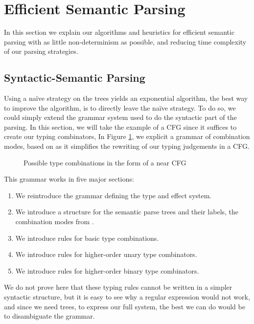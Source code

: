 \section{Efficient Semantic Parsing}
\label{sec:parsing}
In this section we explain our algorithms and heuristics for efficient semantic
parsing with as little non-determinism as possible, and reducing time complexity
of our parsing strategies.

\subsection{Syntactic-Semantic Parsing}
Using a naïve strategy on the trees yields an exponential algorithm,
the best way to improve the algorithm, is to directly leave the naïve strategy.
To do so, we could simply extend the grammar system used to do the syntactic
part of the parsing.
In this section, we will take the example of a CFG since it suffices to create
our typing combinators,
In Figure \ref{fig:combination-cfg}, we explicit a grammar of combination
modes, based on \cite{bumfordEffectdrivenInterpretationFunctors2025} as it
simplifies the rewriting of our typing judgements in a CFG.

\begin{figure}
	
	\caption{Possible type combinations in the form of a near CFG}
	\label{fig:combination-cfg}
\end{figure}

This grammar works in five major sections:
\begin{enumerate}
	\item We reintroduce the grammar defining the type and effect system.
	\item We introduce a structure for the semantic parse trees and their labels,
	      the combination modes from
	      \cite{bumfordEffectdrivenInterpretationFunctors2025}.
	\item We introduce rules for basic type combinations.
	\item We introduce rules for higher-order unary type combinators.
	\item We introduce rules for higher-order binary type combinators.
\end{enumerate}

We do not prove here that these typing rules cannot be written in a simpler
syntactic structure, but it is easy to see why a regular expression would not
work, and since we need trees, to express our full system, the best we can do
would be to disambiguate the grammar.


